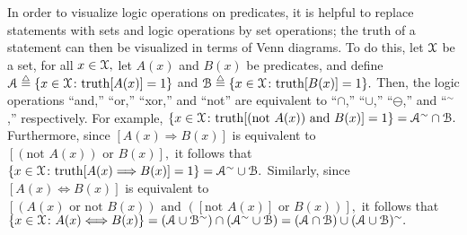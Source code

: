 In order to visualize logic operations on predicates, it is helpful to replace statements with sets and logic operations by set operations; the truth of a statement can then be visualized in terms of Venn diagrams.
%
%
To do this, let ${\mathcal X}$ be a set, for all $x\in{\mathcal X},$ let $A(x)$ and $B(x)$ be predicates, and
%
define $\SA\isdef \{x\in\SX\colon {\rm truth}[A(x)] = 1\}$ and $\SB\isdef \{x\in\SX\colon {\rm truth}[B(x)] = 1\}.$
%
%
Then, the logic operations ``and,'' ``or,'' ``xor,'' and ``not'' are equivalent to ``$\cap$,'' ``$\cup$,'' ``$\ominus$,'' and
``${}^\sim$,'' respectively.
%
%
%
%
For example, $\{x\in{\mathcal X}\colon {\rm truth}[(\mbox{not }A(x)) \mbox{ and }B(x)]=1\} = {\mathcal A}^\sim \cap{\mathcal B}.$
%
Furthermore, since $[A(x) \Longrightarrow B(x)]$ is equivalent to $[(\mbox{not }A(x))\mbox{ or }B(x)],$ it follows that $\{x\in{\mathcal X}\colon {\rm truth}[A(x) \Longrightarrow B(x)]=1\} = {\mathcal A}^\sim\cup{\mathcal B}.$
%
Similarly, since $[A(x) \Longleftrightarrow B(x)]$ is equivalent to $[(A(x) \mbox{ or } \mbox{not } B(x)) \mbox{ and } ( [\mbox{not }A(x)]  \mbox{ or }  B(x) )],$ it follows that
%
$\{x\in{\mathcal X}\colon A(x) \Longleftrightarrow B(x)\} = ({\mathcal A} \cup{\mathcal B}^\sim)\cap ({\mathcal A}^\sim\cup  {\mathcal B}) = ({\mathcal A}\cap{\mathcal B})\cup({\mathcal A}\cup{\mathcal B})^\sim.$







